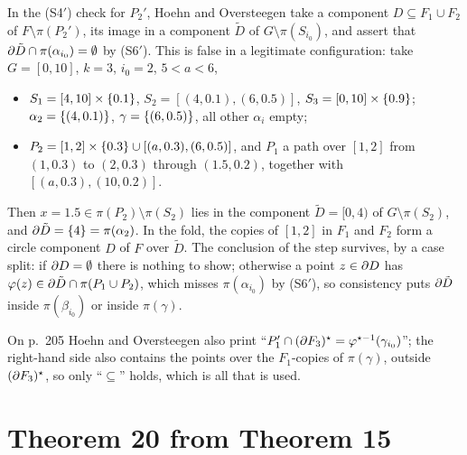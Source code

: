 
\begin{remark}\label{rem:p208}
In the (S4$'$) check for $P_2'$, Hoehn and Oversteegen take a component $D\subseteq F_1\cup F_2$ of $F\setminus\pi(P_2')$, its image in a component $\tilde D$ of $G\setminus\pi(S_{i_0})$, and assert
that $\partial\tilde D\cap\pi(\alpha_{i_0})=\emptyset$ by (S6$'$). This is false in a legitimate configuration: take $G=[0,10]$, $k=3$, $i_0=2$, $5<a<6$,
\begin{itemize}
\item $S_1=[4,10]\times\left\{ 0.1 \right\}$, $S_2=[(4,0.1),(6,0.5)]$, $S_3=[0,10]\times\left\{ 0.9 \right\}$; $\alpha_2=\left\{ (4,0.1) \right\}$, $\gamma=\left\{ (6,0.5) \right\}$, all other $\alpha_i$ empty;
\item $P_2=[1,2]\times\left\{ 0.3 \right\}\cup[(a,0.3),(6,0.5)]$, and $P_1$ a path over $[1,2]$ from $(1,0.3)$ to $(2,0.3)$ through $(1.5,0.2)$, together with $[(a,0.3),(10,0.2)]$.
\end{itemize}
Then $x=1.5\in\pi(P_2)\setminus\pi(S_2)$ lies in the component $\tilde D=[0,4)$ of $G\setminus\pi(S_2)$, and $\partial\tilde D=\left\{ 4 \right\}=\pi(\alpha_2)$. In the fold, the copies of $[1,2]$ in $F_1$ and $F_2$ form a
circle component $D$ of $F$ over $\tilde D$. The conclusion of the step survives, by a case split: if $\partial D=\emptyset$ there is nothing to show; otherwise a point $z\in\partial D$ has
$\varphi(z)\in\partial\tilde D\cap\pi(P_1\cup P_2)$, which misses $\pi(\alpha_{i_0})$ by (S6$'$), so consistency puts $\partial\tilde D$ inside $\pi(\beta_{i_0})$ or inside $\pi(\gamma)$.
\end{remark}


On p.~205 Hoehn and Oversteegen also print ``$P_1'\cap(\partial F_3)^\star=\varphi^{\star-1}(\gamma_{i_0})$''; the right-hand side also contains the points over the $F_1$-copies of $\pi(\gamma)$, outside
$(\partial F_3)^\star$, so only ``$\subseteq$'' holds, which is all that is used.

\section{Theorem 20 from Theorem 15}

